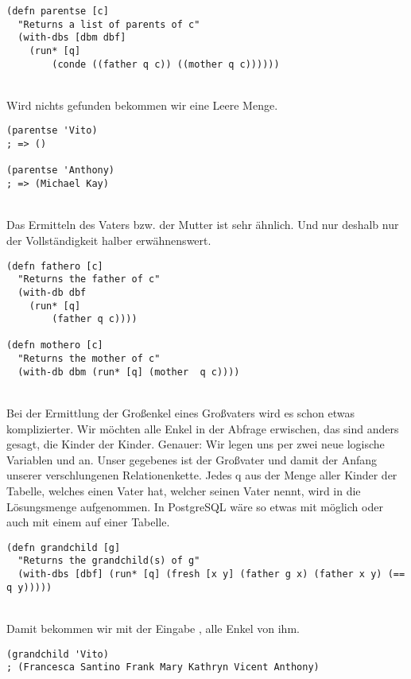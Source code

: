 \begin{lstlisting}
(defn parentse [c] 
  "Returns a list of parents of c"
  (with-dbs [dbm dbf] 
	(run* [q] 
		(conde ((father q c)) ((mother q c))))))
\end{lstlisting}
\\
Wird nichts gefunden bekommen wir eine Leere Menge.

\begin{lstlisting}
(parentse 'Vito)
; => ()

(parentse 'Anthony)
; => (Michael Kay)
\end{lstlisting}
\\
Das Ermitteln des Vaters bzw. der Mutter ist sehr ähnlich. Und nur deshalb nur der Vollständigkeit halber erwähnenswert.

\begin{lstlisting}
(defn fathero [c]
  "Returns the father of c"
  (with-db dbf 
	(run* [q] 
		(father q c))))

(defn mothero [c]
  "Returns the mother of c"
  (with-db dbm (run* [q] (mother  q c))))
\end{lstlisting}
\\
Bei der Ermittlung der Großenkel eines Großvaters wird es schon etwas komplizierter. Wir möchten alle Enkel in der Abfrage erwischen, das sind anders gesagt, die Kinder der Kinder. Genauer: Wir legen uns per  zwei neue logische Variablen  und  an. Unser gegebenes  ist der Großvater und damit der Anfang unserer \dq{}verschlungenen\dq{} Relationenkette. Jedes q aus der Menge aller Kinder der  Tabelle, welches einen Vater  hat, welcher  seinen Vater nennt, wird in die Lösungsmenge aufgenommen. In PostgreSQL wäre so etwas mit  möglich oder auch mit einem  auf einer Tabelle.

\begin{lstlisting}
(defn grandchild [g]
  "Returns the grandchild(s) of g"
  (with-dbs [dbf] (run* [q] (fresh [x y] (father g x) (father x y) (== q y)))))
\end{lstlisting}
\\
Damit bekommen wir mit der Eingabe , alle Enkel von ihm.

\begin{lstlisting}
(grandchild 'Vito)
; (Francesca Santino Frank Mary Kathryn Vicent Anthony)
\end{lstlisting}
